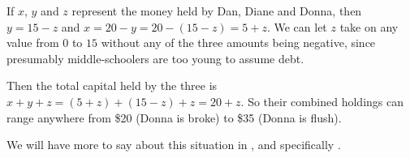 If $x$, $y$ and $z$ represent the money held by Dan, Diane and Donna, then $y=15-z$ and $x=20-y=20-(15-z)=5+z$.  We can let $z$ take on any value from $0$ to $15$ without any of the three amounts being negative, since presumably middle-schoolers are too young to assume debt.\par
%
Then the total capital held by the three is $x+y+z=(5+z)+(15-z)+z=20+z$.  So their combined holdings can range anywhere from \$20 (Donna is broke) to \$35 (Donna is flush).\par
%
We will have more to say about this situation in , and specifically .
